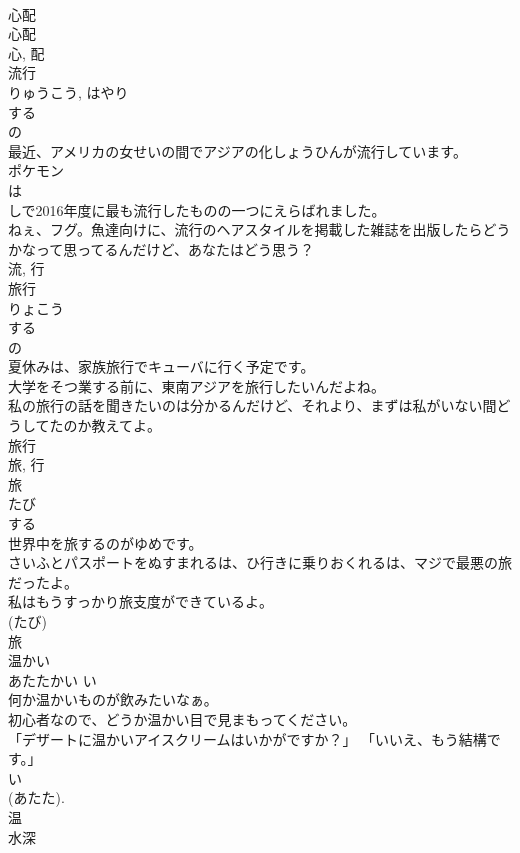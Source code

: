 \documentclass[8pt]{extreport}
\begin{document}
\begin{CJK}{UTF8}{min}
\\	心配 
\\	心配 
\\	心, 配	
\\	流行	
\\	りゅうこう, はやり	
\\	する 
\\	の 
\\	最近、アメリカの女せいの間でアジアの化しょうひんが流行しています。	
\\	ポケモン
\\	は
\\	しで2016年度に最も流行したものの一つにえらばれました。	
\\	ねぇ、フグ。魚達向けに、流行のヘアスタイルを掲載した雑誌を出版したらどうかなって思ってるんだけど、あなたはどう思う？	
\\	流, 行	
\\	旅行	
\\	りょこう	
\\	する 
\\	の 
\\	夏休みは、家族旅行でキューバに行く予定です。	
\\	大学をそつ業する前に、東南アジアを旅行したいんだよね。	
\\	私の旅行の話を聞きたいのは分かるんだけど、それより、まずは私がいない間どうしてたのか教えてよ。	
\\	旅行 
\\	旅, 行	
\\	旅	
\\	たび	
\\	する 
\\	世界中を旅するのがゆめです。	
\\	さいふとパスポートをぬすまれるは、ひ行きに乗りおくれるは、マジで最悪の旅だったよ。	
\\	私はもうすっかり旅支度ができているよ。	
\\	(たび) 
\\	旅	
\\	温かい	
\\	あたたかい	い 
\\	何か温かいものが飲みたいなぁ。	
\\	初心者なので、どうか温かい目で見まもってください。	
\\	「デザートに温かいアイスクリームはいかがですか？」 「いいえ、もう結構です。」	
\\	い 
\\	(あたた). 
\\	温	
\\	水深	

\end{CJK}
\end{document}
